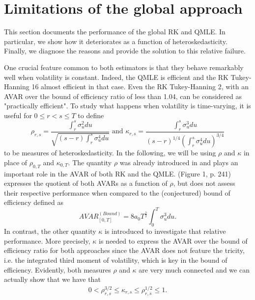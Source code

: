 \documentclass[11pt]{article}
\numberwithin{equation}{section}
\theoremstyle{plain}
\theoremstyle{remark}
\begin{document}
\section{Limitations of the global approach} \label{limitations}
This section documents the performance of the global RK and QMLE. In particular, we show how it deteriorates as a function of heteroskedasticity. Finally, we diagnose the reasons and provide the solution to this relative failure. 

\smallskip
One crucial feature common to both estimators is that they behave remarkably well when volatility is constant. Indeed, the QMLE is efficient and the RK Tukey-Hanning 16 almost efficient in that case. Even the RK Tukey-Hanning 2, with an AVAR over the bound of efficiency ratio of less than 1.04, can be considered as "practically efficient". To study what happens when volatility is time-varying, it is useful for $0 \leq r < s \leq T$  to define
$$\rho_{r,s} = \frac{\int_r^s \sigma_u^2 du}{\sqrt{(s-r) \int_r^s \sigma_u^4 du}} \text{ and  } \kappa_{r,s} = \frac{\int_r^s \sigma_u^3 du}{
(s-r)^{1/4}(\int_r^s \sigma_u^4 du)^{3/4}}$$
to be measures of heteroskedasticity. In the following, we will be using $\rho$ and $\kappa$ in place of $\rho_{0,T}$ and $\kappa_{0,T}$. The quantity $\rho$ was already introduced in \cite{barndorff2008designing} and plays an important role in the AVAR of both RK and the QMLE. \cite{xiu2010quasi} (Figure 1, p. 241) expresses the quotient of both AVARs as a function of $\rho$, but does not assess their respective performance when compared to the (conjectured) bound of efficiency defined as $$AVAR_{[0,T]}^{(Bound)} = 8 a_0 T^{\frac{1}{2}} \int_0^T \sigma_u^3 du.$$ 
In contrast, the other quantity $\kappa$ is introduced to investigate that relative performance. More precisely, $\kappa$ is needed to express the AVAR over the bound of efficiency ratio for both approaches since the AVAR does not feature the tricity, i.e. the integrated third moment of volatility, which is key in the bound of efficiency. Evidently, both measures $\rho$ and $\kappa$ are very much connected and we can actually show that we have that 
\begin{eqnarray}
\label{RhoKappa}
0 < \rho_{r,s}^{3/2} \leq \kappa_{r,s} \leq \rho_{r,s}^{1/2} \leq 1.
\end{eqnarray}
\end{document}
